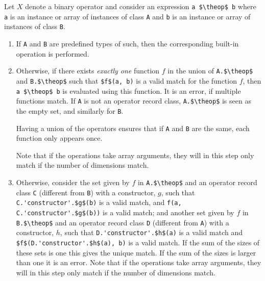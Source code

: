 \newcommand{\theop}{X}

Let $\theop$ denote a binary operator and consider an expression \lstinline!a $\theop$ b! where \lstinline!a! is an instance or array of instances of class \lstinline!A! and \lstinline!b! is an instance or array of instances of class \lstinline!B!.

\begin{enumerate}
\item\label{overloaded-binary-predefined}
  If \lstinline!A! and \lstinline!B! are predefined types of such, then the corresponding built-in operation is performed.
\item\label{overloaded-binary-unique}
  Otherwise, if there exists \emph{exactly one} function $f$ in the union of \lstinline!A.$\theop$! and \lstinline!B.$\theop$! such that \lstinline!$f$(a, b)! is a valid match for the function $f$, then \lstinline!a $\theop$ b! is evaluated using this function.
  It is an error, if multiple functions match.
  If \lstinline!A! is not an operator record class, \lstinline!A.$\theop$! is seen as the empty set, and similarly for \lstinline!B!.
  \begin{nonnormative}
  Having a union of the operators ensures that if \lstinline!A! and \lstinline!B! are the same, each function only appears once.
  \end{nonnormative}
  Note that if the operations take array arguments, they will in this step only match if the number of dimensions match.
\item
  Otherwise, consider the set given by $f$ in \lstinline!A.$\theop$! and an operator record class \lstinline!C! (different from \lstinline!B!) with a constructor, $g$, such that
  \lstinline!C.'constructor'.$g$(b)!
  is a valid match, and
  \lstinline!f(a, C.'constructor'.$g$(b))!
  is a valid match; and another set given by $f$ in \lstinline!B.$\theop$! and an operator record class \lstinline!D! (different from \lstinline!A!) with a constructor, $h$, such that
  \lstinline!D.'constructor'.$h$(a)!
  is a valid match and
  \lstinline!$f$(D.'constructor'.$h$(a), b)!
  is a valid match.
  If the sum of the sizes of these sets is one this gives the unique match.
  If the sum of the sizes is larger than one it is an error.
  Note that if the operations take array arguments, they will in this step only match if the number of dimensions match.

\end{enumerate}
